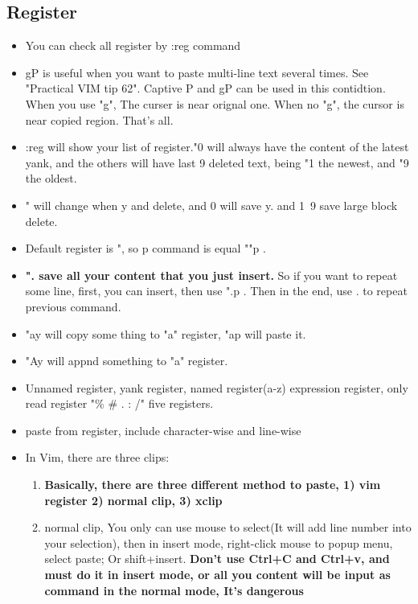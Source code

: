 \documentclass[a4paper,11pt,twoside]{book}
\begin{document}
\subsection{Register}
	\begin{itemize}
			\item You can check all register by :reg command 
			
			\item gP is useful when you want to paste multi-line text several times. See "Practical VIM tip 62". Captive P and gP can be used in this contidtion. When you use "g", The curser is near orignal one. When no "g", the cursor is near copied region. That's all.

			\item :reg will show your list of register."0 will always have the content of the latest yank, and the others will have last 9 deleted text, being "1 the newest, and "9 the oldest.

			\item " will change when y and delete, and 0 will save y. and 1~9 save large block delete. 

			\item Default register is ", so p command is equal ""p .

			\item \textbf{". save all your content that you just insert.} So if you want to repeat some line, first, you can insert, then use ".p . Then in the end, use . to repeat previous command. 

			\item "ay will copy some thing to "a" register, "ap will paste it.
					
			\item "Ay will appnd something to "a" register.

			\item Unnamed register, yank register,  named register(a-z) expression register, only read register "\% \# . : /" five registers. 

			\item paste from register,  include character-wise and line-wise 
					
		\item In Vim, there are three clips: 
				\begin{enumerate}
		\item \textbf{Basically, there are three different method to paste, 1) vim register 2) normal clip, 3) xclip} 

		\item normal clip, You only can use mouse to select(It will add line number into your selection), then in insert mode, right-click mouse to popup menu, select paste; Or shift+insert. \textbf{Don't use Ctrl+C and Ctrl+v, and must do it in insert mode, or all you content will be input as command in the normal mode, It's dangerous}
		

\end{enumerate}
\end{itemize}
\end{document}
